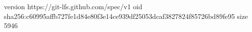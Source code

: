 version https://git-lfs.github.com/spec/v1
oid sha256:c60995affb727fe1d84e80f3e14ce939df25053dcaf3827824f85726bd89fe95
size 5946
